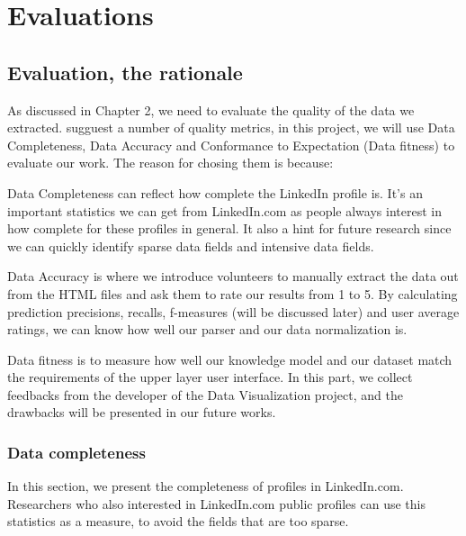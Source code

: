 \chapter{Evaluations}\label{chap:eval}

\newcommand{\round}[1]{\DTLround{#1}{#1}{4}#1}

\section{Evaluation, the rationale}

As discussed in Chapter 2, we need to evaluate the quality of the data we extracted. \cite{ochoa2006} sugguest a number of quality metrics, in this project, we will use Data Completeness, Data Accuracy and Conformance to Expectation (Data fitness) to evaluate our work. The reason for chosing them is because: 

\begin{description}
	\item Data Completeness can reflect how complete the LinkedIn profile is. It's an important statistics we can get from LinkedIn.com as people always interest in how complete for these profiles in general. It also a hint for future research since we can quickly identify sparse data fields and intensive data fields.
	\item Data Accuracy is where we introduce volunteers to manually extract the data out from the HTML files and ask them to rate our results from 1 to 5. By calculating prediction precisions, recalls, f-measures (will be discussed later) and user average ratings, we can know how well our parser and our data normalization is.
	\item Data fitness is to measure how well our knowledge model and our dataset match the requirements of the upper layer user interface. In this part, we collect feedbacks from the developer of the Data Visualization project, and the drawbacks will be presented in our future works.
\end{description}

\subsection{Data completeness}

In this section, we present the completeness of profiles in LinkedIn.com. Researchers who also interested in LinkedIn.com public profiles can use this statistics as a measure, to avoid the fields that are too sparse.

